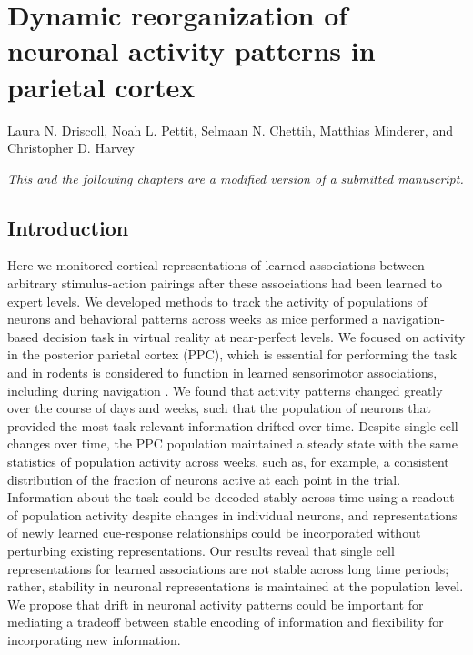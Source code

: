 \chapter{Dynamic reorganization of neuronal activity patterns in parietal cortex} 

\vspace*{-44pt}

Laura N. Driscoll, Noah L. Pettit, Selmaan N. Chettih, Matthias Minderer, and Christopher D. Harvey

\smallskip
\textit{This and the following chapters are a modified version of a submitted manuscript.}

\vspace*{50pt}

\section{Introduction} \label{sec:chap3_intro}


Here we monitored cortical representations of learned associations between arbitrary stimulus-action pairings after these associations had been learned to expert levels. We developed methods to track the activity of populations of neurons and behavioral patterns across weeks as mice performed a navigation-based decision task in virtual reality at near-perfect levels. We focused on activity in the posterior parietal cortex (PPC), which is essential for performing the task and in rodents is considered to function in learned sensorimotor associations, including during navigation \citep{Harvey:2012du, McNaughton1994, Nitz2006, Whitlock2012}. We found that activity patterns changed greatly over the course of days and weeks, such that the population of neurons that provided the most task-relevant information drifted over time. Despite single cell changes over time, the PPC population maintained a steady state with the same statistics of population activity across weeks, such as, for example, a consistent distribution of the fraction of neurons active at each point in the trial. Information about the task could be decoded stably across time using a readout of population activity despite changes in individual neurons, and representations of newly learned cue-response relationships could be incorporated without perturbing existing representations. Our results reveal that single cell representations for learned associations are not stable across long time periods; rather, stability in neuronal representations is maintained at the population level. We propose that drift in neuronal activity patterns could be important for mediating a tradeoff between stable encoding of information and flexibility for incorporating new information.

